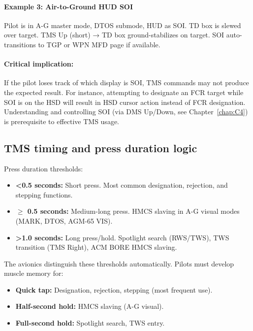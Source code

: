 \documentclass[11pt, a4paper, twoside]{report}
\begin{document}
\paragraph{Example 3: Air-to-Ground HUD SOI}
Pilot is in A-G master mode, DTOS submode, HUD as SOI. TD box is slewed over target. TMS Up (short) → TD box ground-stabilizes on target. SOI auto-transitions to TGP or WPN MFD page if available.

\paragraph{Critical implication:}
If the pilot loses track of which display is SOI, TMS commands may not produce the expected result. For instance, attempting to designate an FCR target while SOI is on the HSD will result in HSD cursor action instead of FCR designation. Understanding and controlling SOI (via DMS Up/Down, see Chapter~\ref{chap:C4}) is prerequisite to effective TMS usage.

\subsection{TMS timing and press duration logic}
\label{sec:C4-S1-S4}

Press duration thresholds:
\begin{itemize}
    \item \textbf{<0.5 seconds:} Short press. Most common designation, rejection, and stepping functions.
    \item \textbf{$\geq$ 0.5 seconds:} Medium-long press. HMCS slaving in A-G visual modes (MARK, DTOS, AGM-65 VIS).
    \item \textbf{>1.0 seconds:} Long press/hold. Spotlight search (RWS/TWS), TWS transition (TMS Right), ACM BORE HMCS slaving.
\end{itemize}

The avionics distinguish these thresholds automatically. Pilots must develop muscle memory for:
\begin{itemize}
    \item \textbf{Quick tap:} Designation, rejection, stepping (most frequent use).
    \item \textbf{Half-second hold:} HMCS slaving (A-G visual).
    \item \textbf{Full-second hold:} Spotlight search, TWS entry.
\end{itemize}
\end{document}
